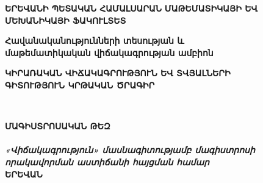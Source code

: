 \setmainfont{DejaVu Sans}


\begin{center}

\fontsize{18pt}{19.2pt} \textbf{ԵՐԵՎԱՆԻ ՊԵՏԱԿԱՆ ՀԱՄԱԼՍԱՐԱՆ}\vspace{11.5pt}
\fontsize{18pt}{16.8pt}  \textbf{\uppercase{ՄԱԹԵՄԱՏԻԿԱՅԻ ԵՎ ՄԵԽԱՆԻԿԱՅԻ ՖԱԿՈՒԼՏԵՏ}}\\ 
    \vfill

\fontsize{16pt}{16.8pt} \textbf { {Հավանականությունների տեսության և \\ մաթեմատիկական վիճակագրության ամբիոն}}\\

\vfill 
   
\fontsize{17.8pt}{16.8pt} \textbf { \uppercase{ԿԻՐԱՌԱԿԱՆ ՎԻՃԱԿԱԳՐՈՒԹՅՈՒՆ ԵՎ ՏՎՅԱԼՆԵՐԻ \\ ԳԻՏՈՒԹՅՈՒՆ ԿՐԹԱԿԱՆ ԾՐԱԳԻՐ} \\}

\vfill

\fontsize{18pt}{21.6pt} \textbf{\MakeUppercase{\authorFullNameArm}}\\

\vfill

\fontsize{18pt}{36pt}\textbf{\uppercase{ՄԱԳԻՍՏՐՈՍԱԿԱՆ ԹԵԶ
}}\\

\vfill
\fontsize{18pt}{21.6pt} \textbf{\MakeUppercase{\thesisTitleArm}}\\

\vfill
\fontsize{13.3pt}{16.8pt} \textbf{\textit{«Վիճակագրություն» մասնագիտությամբ մագիստրոսի \\ որակավորման աստիճանի հայցման համար
\\}}
\vfill
\fontsize{13pt}{15.6pt}  \textbf{ԵՐԵՎԱՆ \the\year}     

\end{center}
\thispagestyle{empty}
\pagebreak
